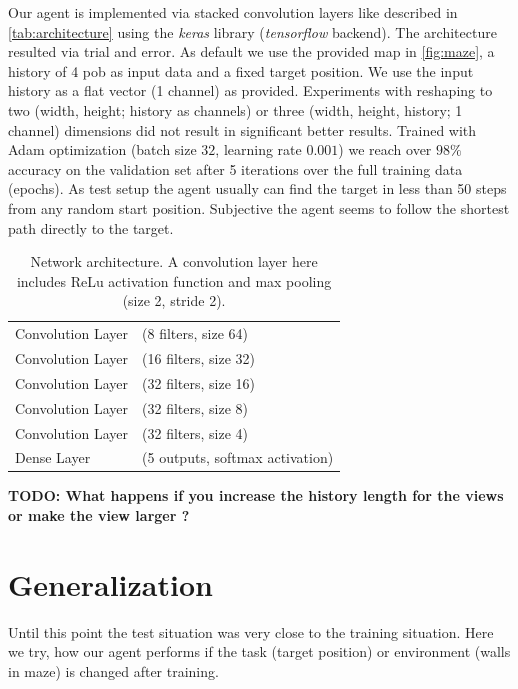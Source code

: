 \documentclass[a4paper,14pt]{article}
\begin{document}
Our agent is implemented via stacked convolution layers like described in
\autoref{tab:architecture} using the \emph{keras} library (\emph{tensorflow} backend).
The architecture resulted via trial and error.
As default we use the provided map in \autoref{fig:maze}, a history of 4 pob as input data
and a fixed target position.
We use the input history as a flat vector (1 channel) as provided.
Experiments with reshaping to two (width, height; history as channels) or three
(width, height, history; 1 channel) dimensions did not result in significant
better results.
Trained with Adam optimization (batch size $32$, learning rate $0.001$) we reach over $98\%$
accuracy on the validation set after 5 iterations over the full training data
(epochs).
As test setup the agent usually can find the target in less than 50 steps from
any random start position.
Subjective the agent seems to follow the shortest path directly to the target.

\begin{table}[h]
  \centering
  \begin{tabular}{ll}
    \hline
    Convolution Layer & (8 filters, size 64) \\
    Convolution Layer & (16 filters, size 32) \\
    Convolution Layer & (32 filters, size 16) \\
    Convolution Layer & (32 filters, size 8) \\
    Convolution Layer & (32 filters, size 4) \\
    Dense Layer & (5 outputs, softmax activation) \\
    \hline
  \end{tabular}
  \caption{Network architecture. A convolution layer here includes ReLu
    activation function and max pooling (size 2, stride 2).}
  \label{tab:architecture}
\end{table}

\textbf{TODO: What happens if you increase the history length for the views or make the
view larger ?}

\section{Generalization}\label{sec:generalization}

Until this point the test situation was very close to the training situation.
Here we try, how our agent performs if the task (target position) or
environment (walls in maze) is changed after training.
\end{document}
